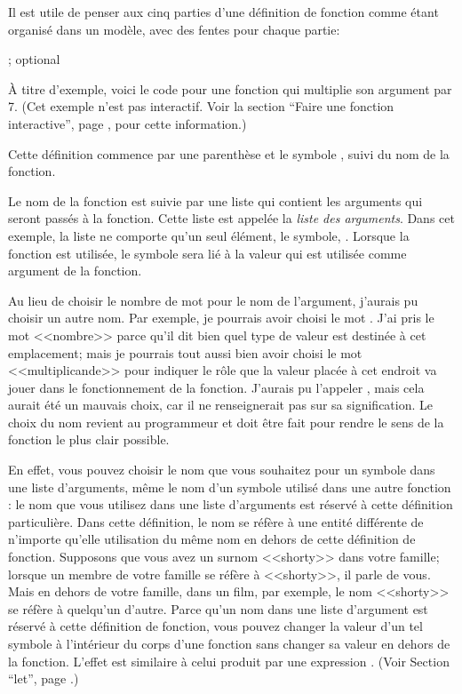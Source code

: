 Il est utile de penser aux cinq parties d'une définition de fonction
comme étant organisé dans un modèle, avec des fentes pour chaque
partie:



 ; optional


\`A titre d'exemple, voici le code pour une fonction qui multiplie son
argument par 7. (Cet exemple n'est pas interactif. Voir la section
 ``Faire une fonction interactive'', page ,
pour cette information.)




Cette définition commence par une parenthèse et le symbole ,
suivi du nom de la fonction.

Le nom de la fonction est suivie par une liste qui contient les
arguments qui seront passés à la fonction. Cette liste est appelée la
\textit{liste des arguments}. Dans cet exemple, la liste ne comporte
qu'un seul élément, le symbole, . Lorsque la fonction est
utilisée, le symbole sera lié à la valeur qui est utilisée comme
argument de la fonction. 

Au lieu de choisir le nombre de mot pour le nom de l'argument,
j'aurais pu choisir un autre nom. Par exemple, je pourrais avoir
choisi le mot . J'ai pris le mot <<nombre>> parce
qu'il dit bien quel type de valeur est destinée à cet emplacement;
mais je pourrais tout aussi bien avoir choisi le mot <<multiplicande>>
pour indiquer le rôle que la valeur placée à cet endroit va jouer dans
le fonctionnement de la fonction. J'aurais pu l'appeler ,
mais cela aurait été un mauvais choix, car il ne renseignerait pas sur
sa signification. Le choix du nom revient au programmeur et doit être
fait pour rendre le sens de la fonction le plus clair possible.

En effet, vous pouvez choisir le nom que vous souhaitez pour un
symbole dans une liste d'arguments, même le nom d'un symbole utilisé
dans une autre fonction : le nom que vous utilisez dans une liste
d'arguments est réservé à cette définition particulière. Dans cette
définition, le nom se réfère à une entité différente de n'importe
qu'elle utilisation du même nom en dehors de cette définition de
fonction. Supposons que vous avez un surnom <<shorty>> dans votre
famille; lorsque un membre de votre famille se réfère à <<shorty>>, il
parle de vous. Mais en dehors de votre famille, dans un film, par
exemple, le nom <<shorty>> se réfère à quelqu'un d'autre. Parce qu'un
nom dans une liste d'argument est réservé à cette définition de
fonction, vous pouvez changer la valeur d'un tel symbole à l'intérieur
du corps d'une fonction sans changer sa valeur en dehors de la
fonction. L'effet est similaire à celui produit par une expression
. (Voir Section  ``let'', page .)


